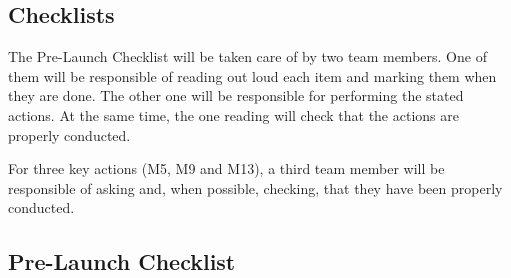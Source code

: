 \documentclass[a4paper,12pt,oneside]{article}
\begin{document}
\begin{appendices}


\newpage
\section{Checklists}\label{sec:Checklist}


The Pre-Launch Checklist will be taken care of by two team members. One of them will be responsible of reading out loud each item and marking them when they are done. The other one will be responsible for performing the stated actions. At the same time, the one reading will check that the actions are properly conducted. 

For three key actions (M5, M9 and M13), a third team member will be responsible of asking and, when possible, checking, that they have been properly conducted. 

\subsection{Pre-Launch Checklist}\label{sec:appL}




\end{appendices}
\end{document}

